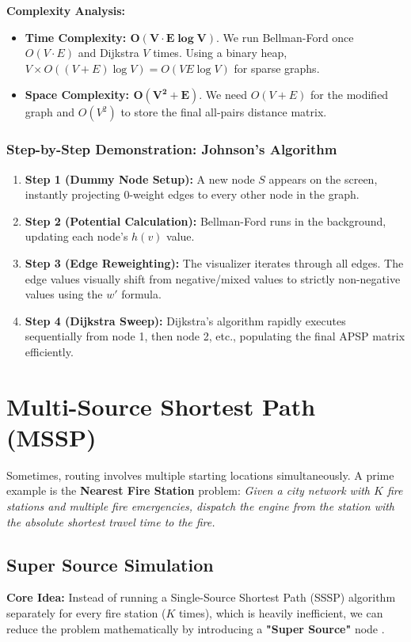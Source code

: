 \textbf{Complexity Analysis:}
\begin{itemize}
    \item \textbf{Time Complexity: $\mathbf{O(V \cdot E \log V)}$}. We run Bellman-Ford once $O(V \cdot E)$ and Dijkstra $V$ times. Using a binary heap, $V \times O((V+E) \log V) = O(VE \log V)$ for sparse graphs.
    \item \textbf{Space Complexity: $\mathbf{O(V^2 + E)}$}. We need $O(V+E)$ for the modified graph and $O(V^2)$ to store the final all-pairs distance matrix.
\end{itemize}

\subsubsection{Step-by-Step Demonstration: Johnson's Algorithm}
\begin{enumerate}
    \item \textbf{Step 1 (Dummy Node Setup):} A new node $S$ appears on the screen, instantly projecting 0-weight edges to every other node in the graph.
    \item \textbf{Step 2 (Potential Calculation):} Bellman-Ford runs in the background, updating each node's $h(v)$ value.
    \item \textbf{Step 3 (Edge Reweighting):} The visualizer iterates through all edges. The edge values visually shift from negative/mixed values to strictly non-negative values using the $w'$ formula.
    \item \textbf{Step 4 (Dijkstra Sweep):} Dijkstra's algorithm rapidly executes sequentially from node 1, then node 2, etc., populating the final APSP matrix efficiently.
\end{enumerate}


\section{Multi-Source Shortest Path (MSSP)}
Sometimes, routing involves multiple starting locations simultaneously. A prime example is the \textbf{Nearest Fire Station} problem: \textit{Given a city network with $K$ fire stations and multiple fire emergencies, dispatch the engine from the station with the absolute shortest travel time to the fire.}

\subsection{Super Source Simulation}
\textbf{Core Idea:} Instead of running a Single-Source Shortest Path (SSSP) algorithm separately for every fire station ($K$ times), which is heavily inefficient, we can reduce the problem mathematically by introducing a \textbf{"Super Source"} node \cite{cormen2022introduction}.

